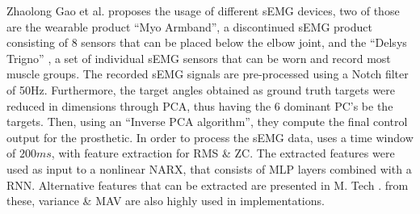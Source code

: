 \documentclass[../main.tex]{subfiles}
\begin{document}
Zhaolong Gao et al. \cite{Zhaolong2021} proposes the usage of different sEMG devices, two of those are the wearable product ``Myo Armband'', \cite{myo} a discontinued sEMG product consisting of 8 sensors that can be placed below the elbow joint, and the ``Delsys Trigno'' \cite{trigno}, a set of individual sEMG sensors that can be worn and record most muscle groups.
The recorded sEMG signals are pre-processed using a Notch filter of 50Hz.
Furthermore, the target angles obtained as ground truth targets were reduced in dimensions through PCA, thus having the 6 dominant PC's be the targets.
Then, using an ``Inverse PCA algorithm'', they compute the final control output for the prosthetic.
In order to process the sEMG data, \cite{Zhaolong2021} uses a time window of $200ms$, with feature extraction for \gls{RMS} \& \gls{ZC}.
The extracted features were used as input to a nonlinear \gls{NARX}, that consists of \gls{MLP}   layers combined with a \gls{RNN}. 
Alternative features that can be extracted are presented in M. Tech \cite{Tech2015}.
from these, variance \& \gls{MAV}
are also highly used in implementations.
\end{document}
